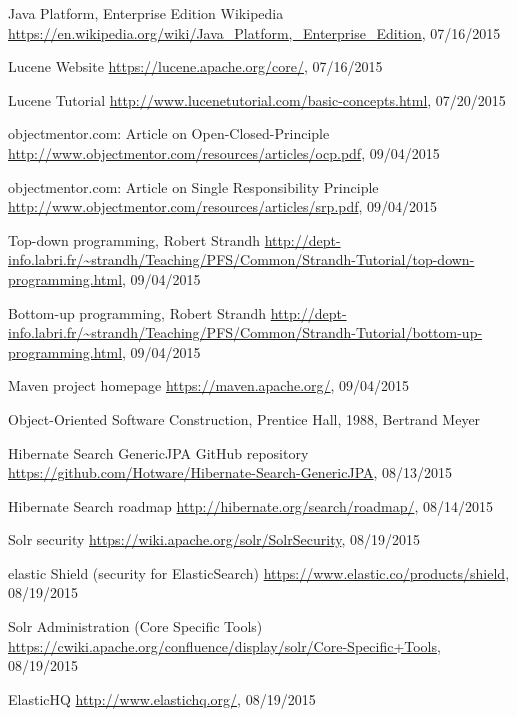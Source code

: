 \begin{thebibliography}{99}
	Java Platform, Enterprise Edition
	Wikipedia
	\url{https://en.wikipedia.org/wiki/Java_Platform,_Enterprise_Edition}, 07/16/2015
	
	Lucene Website
	\url{https://lucene.apache.org/core/}, 07/16/2015
	
	Lucene Tutorial
	\url{http://www.lucenetutorial.com/basic-concepts.html}, 07/20/2015
	
	objectmentor.com: Article on Open-Closed-Principle
	\url{http://www.objectmentor.com/resources/articles/ocp.pdf}, 09/04/2015
	
	objectmentor.com: Article on Single Responsibility Principle
	\url{http://www.objectmentor.com/resources/articles/srp.pdf}, 09/04/2015
	
	Top-down programming, Robert Strandh
	\url{http://dept-info.labri.fr/~strandh/Teaching/PFS/Common/Strandh-Tutorial/top-down-programming.html},
	09/04/2015
	
	Bottom-up programming, Robert Strandh
	\url{http://dept-info.labri.fr/~strandh/Teaching/PFS/Common/Strandh-Tutorial/bottom-up-programming.html},
	09/04/2015
	
	Maven project homepage
	\url{https://maven.apache.org/}, 09/04/2015
	
	Object-Oriented Software Construction, Prentice Hall, 1988, Bertrand Meyer
	
	Hibernate Search GenericJPA GitHub repository
	\url{https://github.com/Hotware/Hibernate-Search-GenericJPA}, 08/13/2015
	
	Hibernate Search roadmap
	\url{http://hibernate.org/search/roadmap/}, 08/14/2015
	
	Solr security
	\url{https://wiki.apache.org/solr/SolrSecurity}, 08/19/2015
	
	elastic Shield (security for ElasticSearch)
	\url{https://www.elastic.co/products/shield}, 08/19/2015
	
	Solr Administration (Core Specific Tools)
	\url{https://cwiki.apache.org/confluence/display/solr/Core-Specific+Tools}, 08/19/2015
	
	ElasticHQ
	\url{http://www.elastichq.org/}, 08/19/2015
	

\end{thebibliography}
